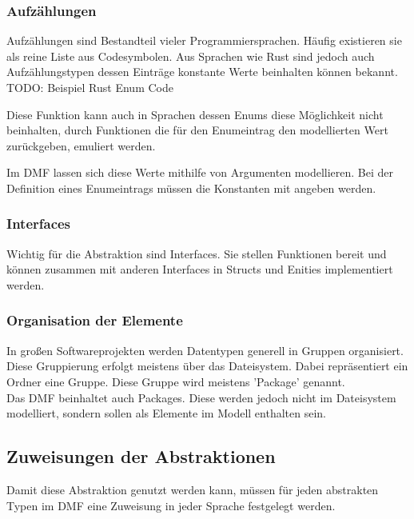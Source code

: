 \documentclass[./einleitung.tex]{subfiles}
\begin{document}
\subsubsection{Aufzählungen}
Aufzählungen sind Bestandteil vieler Programmiersprachen. Häufig existieren sie als reine Liste  aus Codesymbolen. Aus Sprachen wie Rust sind jedoch auch Aufzählungstypen dessen Einträge konstante Werte beinhalten können bekannt.
TODO: Beispiel Rust Enum Code

Diese Funktion kann auch in Sprachen dessen Enums diese Möglichkeit nicht beinhalten, durch Funktionen die für den Enumeintrag den modellierten Wert zurückgeben, emuliert werden.

Im DMF lassen sich diese Werte mithilfe von Argumenten modellieren. Bei der Definition eines Enumeintrags müssen die Konstanten mit angeben werden.

\subsubsection{Interfaces}
Wichtig für die Abstraktion sind Interfaces. Sie stellen Funktionen bereit und können zusammen mit anderen Interfaces in Structs und Enities implementiert werden.

\subsubsection{Organisation der Elemente}
In großen Softwareprojekten werden Datentypen generell in Gruppen organisiert. Diese Gruppierung erfolgt meistens über das Dateisystem. Dabei repräsentiert ein Ordner eine Gruppe. Diese Gruppe wird meistens 'Package' genannt. \\
Das DMF beinhaltet auch Packages. Diese werden jedoch nicht im Dateisystem modelliert, sondern sollen als Elemente im Modell enthalten sein.
\subsection{Zuweisungen der Abstraktionen}

Damit diese Abstraktion genutzt werden kann, müssen für jeden abstrakten Typen im DMF eine Zuweisung in jeder Sprache festgelegt werden.
\end{document}
